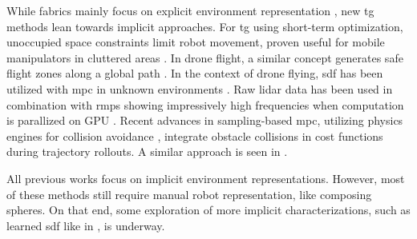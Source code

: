 While \ac{fabrics} mainly focus on explicit environment
representation \cite{Spahn2023,Ratliff2020}, new \ac{tg}
methods lean towards implicit approaches. For \ac{tg} using
short-term optimization, unoccupied space constraints limit
robot movement, proven useful for mobile manipulators in
cluttered areas \cite{Spahn2021}. In drone flight, a similar
concept generates safe flight zones along a global path
\cite{Liu2017a,Tordesillas2019a}. In the context of drone
flying, \ac{sdf} has been utilized with \ac{mpc} in unknown
environments \cite{Oleynikova2017voxblox}. Raw lidar data
has been used in combination with \acp{rmp} showing
impressively high frequencies when computation is parallized
on GPU \cite{Pantic2023obstacle}. Recent advances in
sampling-based \ac{mpc}, utilizing physics engines for
collision avoidance \cite{Pezzato2023sampling}, integrate
obstacle collisions in cost functions during trajectory
rollouts. A similar approach is seen in
\cite{Sundaralingam2023curobo}.

All previous works focus on implicit environment
representations. However, most of these methods still
require manual robot representation, like composing spheres.
On that end, some exploration of more implicit
characterizations, such as learned \ac{sdf} like in
\cite{Liu2022regularized,Koptev2023neural}, is underway.
